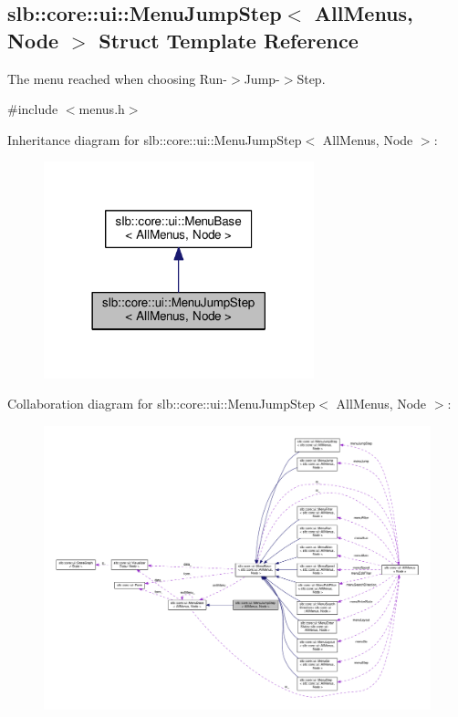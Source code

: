\hypertarget{structslb_1_1core_1_1ui_1_1MenuJumpStep}{}\subsection{slb\+:\+:core\+:\+:ui\+:\+:Menu\+Jump\+Step$<$ All\+Menus, Node $>$ Struct Template Reference}
\label{structslb_1_1core_1_1ui_1_1MenuJumpStep}


The menu reached when choosing Run-\/$>$Jump-\/$>$Step.  




{\ttfamily \#include $<$menus.\+h$>$}



Inheritance diagram for slb\+:\+:core\+:\+:ui\+:\+:Menu\+Jump\+Step$<$ All\+Menus, Node $>$\+:\nopagebreak
\begin{figure}[H]
\begin{center}
\leavevmode
\includegraphics[width=222pt]{structslb_1_1core_1_1ui_1_1MenuJumpStep__inherit__graph}
\end{center}
\end{figure}


Collaboration diagram for slb\+:\+:core\+:\+:ui\+:\+:Menu\+Jump\+Step$<$ All\+Menus, Node $>$\+:\nopagebreak
\begin{figure}[H]
\begin{center}
\leavevmode
\includegraphics[width=350pt]{structslb_1_1core_1_1ui_1_1MenuJumpStep__coll__graph}
\end{center}
\end{figure}
